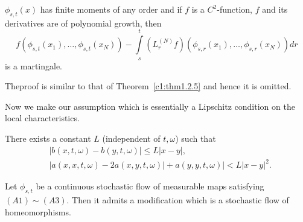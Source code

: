 \setcounter{theorem}{3}
\begin{theorem}%
$\phi_{s,t}{{(x)}}$ has finite moments of any order and if $f$ is a
  $C^2$-function, $f$ and its derivatives are of polynomial growth,
  then 
  \begin{equation*}
    f (\phi_{s,t}{{(x_1)}}, \ldots,\phi_{s,t}{{(x_N)}})
    -\int\limits_s^t (L_r^{(N)} f) (\phi_{s,r}{{(x_1)}},  \ldots,
    \phi_{s,r}{{(x_N)}}) dr \tag{2.1.8}\label{c2:eq2.1.8} 
  \end{equation*}
  is a martingale.
\end{theorem}

The\pageoriginale proof is similar to that of Theorem~\ref{c1:thm1.2.5} and hence it is omitted.

Now we make our assumption which is essentially a Lipschitz condition
on the local characteristics. 

\begin{Assumption}\label{c2:asm3}%
  There exists a constant $L$ (independent of $t, \omega$) such that
  \begin{align*}
    &|b (x, t, \omega) - b (y, t, \omega)| \le L|x-y|, \tag{2.1.8}\\
    &|a (x, x, t, \omega) - 2a ( x, y, t, \omega)| +a(y,y,t,\omega) |
    < L|x-y|^2. \tag{2.1.9}\label{c2:eq2.1.9} 
  \end{align*}
\end{Assumption}


\begin{theorem}\label{c2:thm2.1.5}%
  Let $\phi_{s,t}$ be a continuous stochastic flow of measurable maps
  satisfying $(A1) \sim (A3)$. Then it admits a modification which is a
  stochastic flow of homeomorphisms.  
\end{theorem}

